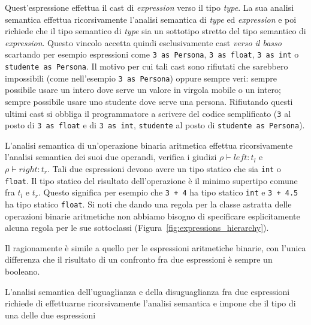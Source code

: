 \begin{description}
  Quest'espressione effettua il cast di \textit{expression} verso il tipo
  \textit{type}. La sua analisi semantica effettua ricorsivamente
  l'analisi semantica di \textit{type} ed \textit{expression} e poi richiede
  che il tipo semantico di \textit{type} sia un sottotipo
  stretto del tipo semantico di \textit{expression}.
  Questo vincolo accetta quindi esclusivamente cast \emph{verso il basso}
  scartando per esempio espressioni come
  \texttt{3 as Persona}, \texttt{3 as float}, \texttt{3 as int} o
  \texttt{studente as Persona}. Il motivo per cui tali cast sono rifiutati
  \e che sarebbero impossibili (come nell'esempio \texttt{3 as Persona})
  oppure sempre veri: \e sempre possibile usare un intero dove serve
  un valore in virgola mobile o un intero; \e sempre possibile usare uno
  studente dove serve una persona. Rifiutando questi ultimi cast si obbliga il
  programmatore a scrivere del codice \piu semplificato
  (\texttt{3} al posto di \texttt{3 as float} e di \texttt{3 as int},
  \texttt{studente} al posto di \texttt{studente as Persona}).
\item[\underline{$\mathtt{ArithmeticBinOp(\mathit{left},\mathit{right})}$}.]
  L'analisi semantica di un'operazione binaria aritmetica effettua
  ricorsivamente l'analisi semantica dei suoi due operandi, \cioe verifica
  i giudizi $\rho\vdash\mathit{left}:t_l$ e $\rho\vdash\mathit{right}:t_r$.
  Tali due espressioni devono avere un tipo statico che sia
  \texttt{int} o \texttt{float}. Il tipo statico del risultato dell'operazione
  \`e il minimo supertipo comune fra $t_l$ e $t_r$. Questo significa per
  esempio che \texttt{3 + 4} ha tipo statico \texttt{int} e
  \texttt{3 + 4.5} ha tipo statico \texttt{float}.
  Si noti che dando una regola per la classe astratta
  delle operazioni binarie aritmetiche
  non abbiamo bisogno di specificare esplicitamente alcuna regola
  per le sue sottoclassi (Figura~\ref{fig:expressions_hierarchy}).
\item[\underline{$\mathtt{NumericalComparisonBinOp
      (\mathit{left},\mathit{right})}$}.]
  Il ragionamente \`e simile a quello per le espressioni aritmetiche binarie,
  con l'unica differenza che il risultato di un confronto fra due espressioni
  \`e sempre un booleano.
\item[\underline{$\mathtt{Equal(\mathit{left},\mathit{right})}$} e
      \underline{$\mathtt{NotEqual(\mathit{left},\mathit{right})}$}.]
  L'analisi semantica dell'uguaglianza e della disuguaglianza fra due
  espressioni richiede di effettuarne ricorsivamente l'analisi semantica
  e impone che il tipo di una delle due espressioni

\end{description}
